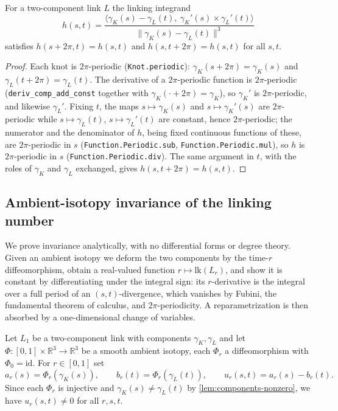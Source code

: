 \begin{lemma}
    \label{lem:integrand-periodic}
    For a two-component link $L$ the linking integrand
    \[
        h(s,t) = \frac{\bigl\langle \gamma_K(s)-\gamma_L(t),\ \gamma_K'(s)\times\gamma_L'(t)\bigr\rangle}
             {\lVert \gamma_K(s)-\gamma_L(t)\rVert^{3}}
    \]
    satisfies $h(s+2\pi,t)=h(s,t)$ and $h(s,t+2\pi)=h(s,t)$ for all $s,t$.
\end{lemma}
\begin{proof}
    Each knot is $2\pi$-periodic (\texttt{Knot.periodic}):
    $\gamma_K(s+2\pi)=\gamma_K(s)$ and $\gamma_L(t+2\pi)=\gamma_L(t)$. The derivative
    of a $2\pi$-periodic function is $2\pi$-periodic (\texttt{deriv\_comp\_add\_const}
    together with $\gamma_K(\cdot+2\pi)=\gamma_K$), so $\gamma_K'$ is $2\pi$-periodic,
    and likewise $\gamma_L'$. Fixing $t$, the maps $s\mapsto\gamma_K(s)$ and
    $s\mapsto\gamma_K'(s)$ are $2\pi$-periodic while $s\mapsto\gamma_L(t)$,
    $s\mapsto\gamma_L'(t)$ are constant, hence $2\pi$-periodic; the numerator and the
    denominator of $h$, being fixed continuous functions of these, are
    $2\pi$-periodic in $s$ (\texttt{Function.Periodic.sub},
    \texttt{Function.Periodic.mul}), so $h$ is $2\pi$-periodic in $s$
    (\texttt{Function.Periodic.div}). The same argument in $t$, with the roles of
    $\gamma_K$ and $\gamma_L$ exchanged, gives $h(s,t+2\pi)=h(s,t)$.
\end{proof}

\subsection{Ambient-isotopy invariance of the linking number}

We prove invariance analytically, with no differential forms or degree theory.
Given an ambient isotopy we deform the two components by the time-$r$
diffeomorphism, obtain a real-valued function $r\mapsto\mathrm{lk}(L_r)$, and show
it is constant by differentiating under the integral sign: its $r$-derivative is
the integral over a full period of an $(s,t)$-divergence, which vanishes by Fubini,
the fundamental theorem of calculus, and $2\pi$-periodicity. A reparametrization is
then absorbed by a one-dimensional change of variables.

\begin{definition}
    \label{def:deformed-curves}
    Let $L_1$ be a two-component link with components $\gamma_K,\gamma_L$ and let
    $\Phi : [0,1]\times\mathbb{R}^3\to\mathbb{R}^3$ be a smooth ambient isotopy, each
    $\Phi_r$ a diffeomorphism with $\Phi_0 = \mathrm{id}$. For $r\in[0,1]$ set
    \[
        a_r(s) = \Phi_r(\gamma_K(s)), \qquad b_r(t) = \Phi_r(\gamma_L(t)),
        \qquad u_r(s,t) = a_r(s) - b_r(t).
    \]
    Since each $\Phi_r$ is injective and $\gamma_K(s)\neq\gamma_L(t)$ by
    \cref{lem:components-nonzero}, we have $u_r(s,t)\neq 0$ for all $r,s,t$.
\end{definition}

